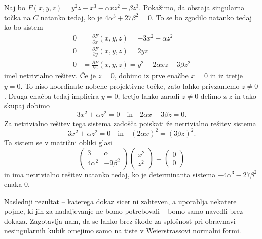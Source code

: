 \documentclass[mat1]{fmfdelo}
\numberwithin{equation}{section}
\newcommand{\pdv}[2][]{\frac{\partial#1}{\partial#2}}
\theoremstyle{definition}
\begin{document}
\begin{dokaz}
    Naj bo $F(x,y,z) = y^2z - x^3 - \alpha xz^2 - \beta z^3$. Pokažimo, da obstaja singularna točka na $C$ natanko tedaj, ko je $4\alpha^3 + 27\beta^2 = 0$. To se bo zgodilo natanko tedaj ko bo sistem
    \begin{align*}
        0 &= \pdv[F]{x}{}(x,y,z) = -3x^2 - \alpha z^2\\
        0 &= \pdv[F]{y}{}(x,y,z) = 2yz\\
        0 &= \pdv[F]{z}{}(x,y,z) = y^2 - 2\alpha xz - 3 \beta z^2
    \end{align*}
    imel netrivialno rešitev. Če je $z = 0$, dobimo iz prve enačbe $x = 0$ in iz tretje $y = 0$. To niso koordinate nobene projektivne točke, zato lahko privzamemo $z \neq 0$. Druga enačba tedaj implicira $y = 0$, tretjo lahko zaradi $z \neq 0$ delimo z $z$ in tako skupaj dobimo
    \[
        3x^2 + \alpha z^2 = 0 \quad \text{in} \quad 2\alpha x - 3 \beta z = 0.   
    \]
    Za netrivialno rešitev tega sistema zadošča poiskati že netrivialno rešitev sistema
    \[
        3x^2 + \alpha z^2 = 0 \quad \text{in} \quad (2\alpha x)^2 = (3 \beta z)^2. 
    \]
    Ta sistem se v matrični obliki glasi
    \[
        \begin{pmatrix}
            3 & \alpha \\
            4\alpha^2 & -9\beta^2
        \end{pmatrix} 
        \begin{pmatrix}
            x^2 \\
            z^2
        \end{pmatrix}
        =
        \begin{pmatrix}
            0 \\
            0
        \end{pmatrix}
    \]
    in ima netrivialno rešitev natanko tedaj, ko je determinanta sistema $-4\alpha^3 - 27\beta^2$ enaka $0$. 
\end{dokaz}


Naslednji rezultat -- katerega dokaz sicer ni zahteven, a uporablja nekatere pojme, ki jih za nadaljevanje ne bomo potrebovali -- bomo samo navedli brez dokaza. Zagotavlja nam, da se lahko brez škode za splošnost pri obravnavi nesingularnih kubik omejimo samo na tiste v Weierstrassovi normalni formi. 
\end{document}
